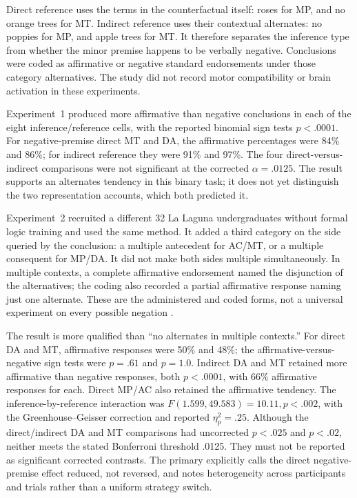 Direct reference uses the terms in the counterfactual itself: roses for
MP, and no orange trees for MT. Indirect reference uses their contextual
alternates: no poppies for MP, and apple trees for MT. It therefore
separates the inference type from whether the minor premise happens
to be verbally negative. Conclusions were coded as affirmative or
negative standard endorsements under those category alternatives.
The study did not record motor compatibility or brain activation in
these experiments.

Experiment~1 produced more affirmative than negative conclusions in
each of the eight inference/reference cells, with the reported binomial
sign tests \(p<.0001\). For negative-premise direct MT and DA, the
affirmative percentages were 84\% and 86\%; for indirect reference
they were 91\% and 97\%. The four direct-versus-indirect comparisons
were not significant at the corrected \(\alpha=.0125\). The result
supports an alternates tendency in this binary task; it does not yet
distinguish the two representation accounts, which both predicted it.

Experiment~2 recruited a different 32 La Laguna undergraduates without
formal logic training and used the same method. It added a third
category on the side queried by the conclusion: a multiple antecedent
for AC/MT, or a multiple consequent for MP/DA. It did not make both
sides multiple simultaneously. In multiple contexts, a complete
affirmative endorsement named the disjunction of the alternatives;
the coding also recorded a partial affirmative response naming just
one alternate. These are the administered and coded forms, not a
universal experiment on every possible negation
\cite[EarlyView pp.~16--21]{EspinoByrne2018Negation}.

The result is more qualified than ``no alternates in multiple contexts.''
For direct DA and MT, affirmative responses were 50\% and 48\%; the
affirmative-versus-negative sign tests were \(p=.61\) and \(p=1.0\).
Indirect DA and MT retained more affirmative than negative responses,
both \(p<.0001\), with 66\% affirmative responses for each. Direct
MP/AC also retained the affirmative tendency. The inference-by-reference
interaction was \(F(1.599,49.583)=10.11,p<.002\), with the
Greenhouse--Geisser correction and reported \(\eta_p^2=.25\).
Although the direct/indirect DA and MT comparisons had uncorrected
\(p<.025\) and \(p<.02\), neither meets the stated Bonferroni
threshold .0125. They must not be reported as significant corrected
contrasts. The primary explicitly calls the direct negative-premise
effect reduced, not reversed, and notes heterogeneity across participants
and trials rather than a uniform strategy switch.

